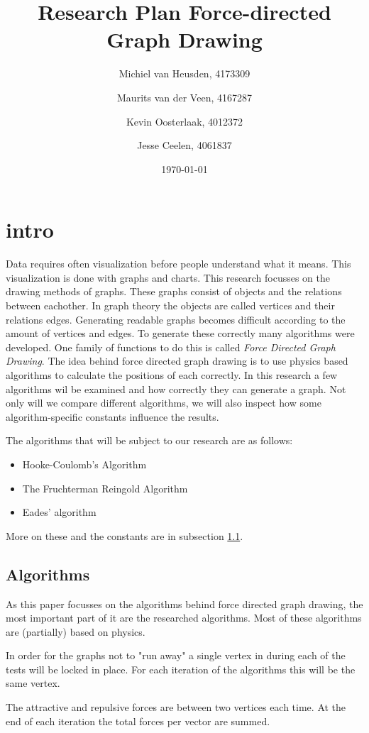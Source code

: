\documentclass[a4paper,12pt]{article}
\title{Research Plan Force-directed Graph Drawing}
\author{
  Michiel van Heusden, 4173309 \and
  Maurits van der Veen, 4167287 \and
  Kevin Oosterlaak, 4012372 \and
  Jesse Ceelen, 4061837
  }
\date{\today}
\begin{document}
  \maketitle
  \tableofcontents
  \section{intro}
  Data requires often visualization before people understand what it means.
  This visualization is done with graphs and charts.
  This research focusses on the drawing methods of graphs.
  These graphs consist of objects and the relations between eachother.
  In graph theory the objects are called vertices and their relations edges.\cite{bondy1976graph}
  Generating readable graphs becomes difficult according to the amount of vertices and edges.
  To generate these correctly many algorithms were developed.
  One family of functions to do this is called \emph{Force Directed Graph Drawing}.
  The idea behind force directed graph drawing is to use physics based algorithms to calculate the positions of each correctly.
  In this research a few algorithms wil be examined and how correctly they can generate a graph.
  Not only will we compare different algorithms, we will also inspect how some algorithm-specific constants influence the results.

  The algorithms that will be subject to our research are as follows:
  \begin{itemize}
    \item Hooke-Coulomb's Algorithm
    \item The Fruchterman Reingold Algorithm
    \item Eades' algorithm
  \end{itemize}
  More on these and the constants are in subsection \ref{par:algorithms}.

  \subsection{Algorithms}\label{par:algorithms}
    As this paper focusses on the algorithms behind force directed graph drawing, the most important part of it are the researched algorithms.
    Most of these algorithms are (partially) based on physics.

    In order for the graphs not to "run away" a single vertex in during each of the tests will be locked in place.
    For each iteration of the algorithms this will be the same vertex.

    The attractive and repulsive forces are between two vertices each time.
    At the end of each iteration the total forces per vector are summed.
\end{document}
